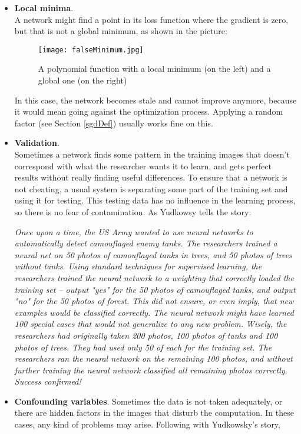 \documentclass[titlepage]{article}
\theoremstyle{plain}
\theoremstyle{definition}
\begin{document}
		\begin{itemize}
			\item \textbf{Local minima}.\\A network might find a point in its loss function where the gradient is zero, but that is not a global minimum, as shown in the picture:\\
			\begin{figure}[H]
				\centering
				\texttt{[image: falseMinimum.jpg]}
				\caption{A polynomial function with a local minimum (on the left) and a global one (on the right)}
				\label{fig:falseMinimum}
			\end{figure}
			In this case, the network becomes stale and cannot improve anymore, because it would mean going against the optimization process. Applying a random factor (see Section \ref{sgdDef}) usually works fine on this.
			\item \textbf{Validation}.\\Sometimes a network finds some pattern in the training images that doesn't correspond with what the researcher wants it to learn, and gets perfect results without really finding useful differences. To ensure that a network is not cheating, a usual system is separating some part of the training set and using it for testing. This testing data has no influence in the learning process, so there is no fear of contamination. As Yudkowsy \cite{Yudkowsky} tells the story:
			\begin{center}
				{\small \it Once upon a time, the US Army wanted to use neural networks to automatically detect camouflaged enemy tanks. The researchers trained a neural net on 50 photos of camouflaged tanks in trees, and 50 photos of trees without tanks. Using standard techniques for supervised learning, the researchers trained the neural network to a weighting that correctly loaded the training set -- output "yes" for the 50 photos of camouflaged tanks, and output "no" for the 50 photos of forest. This did not ensure, or even imply, that new examples would be classified correctly. The neural network might have learned 100 special cases that would not generalize to any new problem. Wisely, the researchers had originally taken 200 photos, 100 photos of tanks and 100 photos of trees. They had used only 50 of each for the training set. The researchers ran the neural network on the remaining 100 photos, and without further training the neural network classified all remaining photos correctly. Success confirmed!}
			\end{center}
			\item \textbf{Confounding variables}. Sometimes the data is not taken adequately, or there are hidden factors in the images that disturb the computation. In these cases, any kind of problems may arise. Following with Yudkowsky's story, 

\end{itemize}
\end{document}
